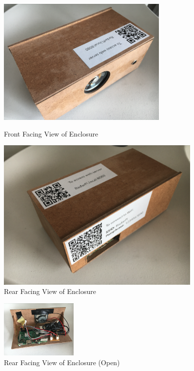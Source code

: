 \begin{figure}[h!]
    \centering
    \begin{minipage}{0.45\textwidth}
        \centering
        \includegraphics[width = 0.75\textwidth]{images/enc3.pdf}
        \caption{Front Facing View of Enclosure}\label{fig:enc3}
    \end{minipage}\hfill
    \begin{minipage}{0.45\textwidth}
        \centering
        \includegraphics[width=0.9\textwidth]{images/enc1.pdf}
        \caption{Rear Facing View of Enclosure}\label{fig:enc1}
    \end{minipage}
\end{figure}

\begin{figure}[h!]
    \centering
    \includegraphics[width = 0.3375\textwidth]{images/enc2.pdf}
    \caption{Rear Facing View of Enclosure (Open)}\label{fig:enc2}
\end{figure}


